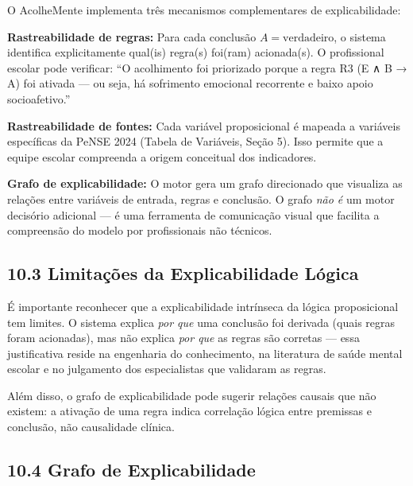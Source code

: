 \documentclass[11pt]{article}
\begin{document}
O AcolheMente implementa três mecanismos complementares de
explicabilidade:

\textbf{Rastreabilidade de regras:} Para cada conclusão
\(A = \text{verdadeiro}\), o sistema identifica explicitamente qual(is)
regra(s) foi(ram) acionada(s). O profissional escolar pode verificar:
``O acolhimento foi priorizado porque a regra R3 (E ∧ B → A) foi ativada
--- ou seja, há sofrimento emocional recorrente e baixo apoio
socioafetivo.''

\textbf{Rastreabilidade de fontes:} Cada variável proposicional é
mapeada a variáveis específicas da PeNSE 2024 (Tabela de Variáveis,
Seção 5). Isso permite que a equipe escolar compreenda a origem
conceitual dos indicadores.

\textbf{Grafo de explicabilidade:} O motor gera um grafo direcionado que
visualiza as relações entre variáveis de entrada, regras e conclusão. O
grafo \emph{não é} um motor decisório adicional --- é uma ferramenta de
comunicação visual que facilita a compreensão do modelo por
profissionais não técnicos.

\subsection{10.3 Limitações da Explicabilidade
Lógica}\label{limitauxe7uxf5es-da-explicabilidade-luxf3gica}

É importante reconhecer que a explicabilidade intrínseca da lógica
proposicional tem limites. O sistema explica \emph{por que} uma
conclusão foi derivada (quais regras foram acionadas), mas não explica
\emph{por que} as regras são corretas --- essa justificativa reside na
engenharia do conhecimento, na literatura de saúde mental escolar e no
julgamento dos especialistas que validaram as regras.

Além disso, o grafo de explicabilidade pode sugerir relações causais que
não existem: a ativação de uma regra indica correlação lógica entre
premissas e conclusão, não causalidade clínica.

\subsection{10.4 Grafo de
Explicabilidade}\label{grafo-de-explicabilidade}
\end{document}
